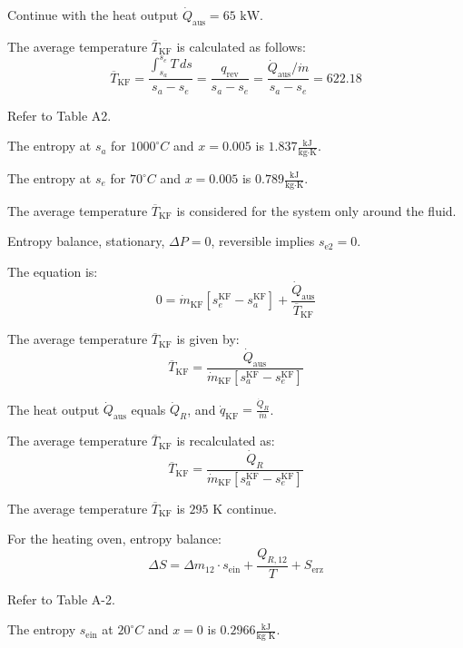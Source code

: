 Continue with the heat output \( \dot{Q}_{\text{aus}} = 65 \text{ kW} \).

The average temperature \( \overline{T}_{\text{KF}} \) is calculated as follows:
\[
\overline{T}_{\text{KF}} = \frac{\int_{s_a}^{s_e} T \, ds}{s_a - s_e} = \frac{q_{\text{rev}}}{s_a - s_e} = \frac{\dot{Q}_{\text{aus}} / \dot{m}}{s_a - s_e} = 622.18
\]

Refer to Table A2.

The entropy at \( s_a \) for \( 1000^\circ C \) and \( x = 0.005 \) is \( 1.837 \frac{\text{kJ}}{\text{kg} \cdot \text{K}} \).

The entropy at \( s_e \) for \( 70^\circ C \) and \( x = 0.005 \) is \( 0.789 \frac{\text{kJ}}{\text{kg} \cdot \text{K}} \).

The average temperature \( \overline{T}_{\text{KF}} \) is considered for the system only around the fluid.

Entropy balance, stationary, \( \Delta P = 0 \), reversible implies \( s_{\text{e2}} = 0 \).

The equation is:
\[
0 = \dot{m}_{\text{KF}} \left[ s_e^{\text{KF}} - s_a^{\text{KF}} \right] + \frac{\dot{Q}_{\text{aus}}}{\overline{T}_{\text{KF}}}
\]

The average temperature \( \overline{T}_{\text{KF}} \) is given by:
\[
\overline{T}_{\text{KF}} = \frac{\dot{Q}_{\text{aus}}}{\dot{m}_{\text{KF}} \left[ s_a^{\text{KF}} - s_e^{\text{KF}} \right]}
\]

The heat output \( \dot{Q}_{\text{aus}} \) equals \( \dot{Q}_R \), and \( \dot{q}_{\text{KF}} = \frac{\dot{Q}_R}{\dot{m}} \).

The average temperature \( \overline{T}_{\text{KF}} \) is recalculated as:
\[
\overline{T}_{\text{KF}} = \frac{\dot{Q}_R}{\dot{m}_{\text{KF}} \left[ s_a^{\text{KF}} - s_e^{\text{KF}} \right]}
\]

The average temperature \( \overline{T}_{\text{KF}} \) is \( 295 \text{ K} \) continue.

For the heating oven, entropy balance:
\[
\Delta S = \Delta m_{12} \cdot s_{\text{ein}} + \frac{Q_{R,12}}{T} + S_{\text{erz}}
\]

Refer to Table A-2.

The entropy \( s_{\text{ein}} \) at \( 20^\circ C \) and \( x=0 \) is \( 0.2966 \frac{\text{kJ}}{\text{kg K}} \).